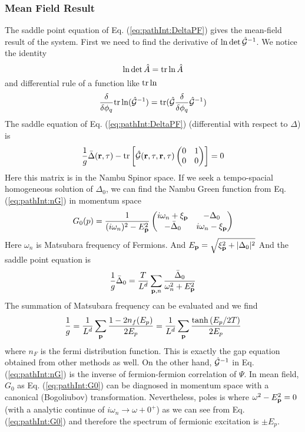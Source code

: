 \subsubsection{Mean Field Result}
The saddle point equation of Eq. (\ref{eq:pathInt:DeltaPF}) gives the mean-field result of the system.  First we need to find the derivative of $\ln\det\hat{\mathcal{G}}^{-1}$.  We notice the identity
\begin{equation}
\ln\det\hat{A}=\text{tr}\ln\hat{A}
\end{equation}
and differential rule of a function like $\text{tr}\ln$
\begin{equation}
\frac{\delta}{\delta\phi_q}\text{tr}\ln(\hat{\mathcal{G}}^{-1})=\text{tr}(\hat{\mathcal{G}}\frac{\delta}{\delta\phi_q}\hat{\mathcal{G}}^{-1})
\end{equation}
The saddle equation of Eq. (\ref{eq:pathInt:DeltaPF}) (differential with respect to $\Delta$) is
\begin{equation}
\frac{1}{g}\bar{\Delta}(\mathbf{r},\tau)-\text{tr}\left[\hat{\mathcal{G}}(\mathbf{r},\tau,\mathbf{r},\tau)\begin{pmatrix}0&1\\0&0\end{pmatrix}\right]=0
\end{equation}
Here this matrix is in the Nambu Spinor space.  If we seek a tempo-spacial homogeneous solution of $\Delta_0$, we can find the Nambu Green function from Eq. (\ref{eq:pathInt:nG}) in momentum space
\begin{equation}\label{eq:pathInt:G0}
G_0(p)=\frac{1}{(i\omega_n)^2-E_{\mathbf{p}}^2}
\begin{pmatrix}
	i\omega_n+\xi_{\mathbf{p}}&-\Delta_0\\
	-\bar{\Delta}_0&i\omega_n-\xi_{\mathbf{p}}
\end{pmatrix}
\end{equation}
Here $\omega_n$ is Matsubara frequency of Fermions.   And $E_{\mathbf{p}}=\sqrt{\xi_{\mathbf{p}}^2+\lvert{\Delta_0}\rvert^2}$ And the saddle point equation is 
\begin{equation}
\frac{1}{g}\bar{\Delta}_0=\frac{T}{L^d}\sum_{\mathbf{p},n}\frac{\bar\Delta_0}{\omega_n^2+E_{\mathbf{p}}^2}
\end{equation}
The summation of Matsubara frequency can be evaluated and we find 
\begin{equation}
\frac{1}{g}=\frac{1}{L^d}\sum_{\mathbf{p}}\frac{1-2n_f(E_p)}{2E_p}=\frac{1}{L^d}\sum_{\mathbf{p}}\frac{\tanh{(E_p/2T)}}{2E_p}
\label{eq:pathInt:gap}
\end{equation}
where $n_F$ is the fermi distribution function.  This is exactly the gap equation obtained from other methods as well.  On the other hand, $\hat{\mathcal{G}}^{-1}$ in Eq. (\ref{eq:pathInt:nG})  is the inverse of fermion-fermion correlation of $\Psi$.  In mean field, $G_{0}$ as Eq. (\ref{eq:pathInt:G0}) can be diagnosed in momentum space with a canonical (Bogoliubov) transformation.  Nevertheless, poles is where  $\omega^2-E_{\mathbf{p}}^2=0$ (with a analytic continue of $i\omega_{n}\rightarrow\omega+0^{+}$) as we can see from  Eq. (\ref{eq:pathInt:G0}) and therefore the spectrum of fermionic excitation is $\pm{}E_{p}$.  


